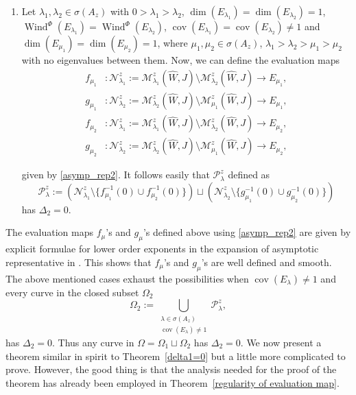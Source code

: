 \documentclass[11pt, a4paper]{amsart}
\newcommand{\cM}{\mathcal{M}}
\newcommand{\cN}{\mathcal{N}}
\newcommand{\cP}{\mathcal{P}}
\DeclareMathOperator{\wind}{Wind}
\DeclareMathOperator{\cov}{cov}
\begin{document}
\begin{enumerate}[topsep=5pt,itemsep=5pt]
    \item Let $\lambda_1, \lambda_2 \in \sigma(A_z)$ with $0>\lambda_1>\lambda_2$, $\dim(E_{\lambda_1})=\dim(E_{\lambda_2})=1$, $\wind^{\Phi}(E_{\lambda_1})=\wind^{\Phi}(E_{\lambda_2})$, $\cov(E_{\lambda_1})=\cov(E_{\lambda_2}) \neq 1$ and $\dim(E_{\mu_1})=\dim(E_{\mu_2})=1$, where $\mu_1,\mu_2 \in \sigma(A_z)$, $\lambda_1> \lambda_2>\mu_1>\mu_2$ with no eigenvalues between them.  Now, we can define the evaluation maps 
    \begin{equation*}
        \begin{split}
            f_{\mu_1} &:\cN^z_{\lambda_1}:=\cM^z_{\lambda_1}(\widehat{W},J) \setminus \cM^z_{\lambda_2}(\widehat{W},J) \rightarrow E_{\mu_1},\\ 
            g_{\mu_1} &:\cN^z_{\lambda_2}:=\cM^z_{\lambda_2}(\widehat{W},J) \setminus \cM^z_{\mu_1}(\widehat{W},J) \rightarrow E_{\mu_1},\\
            f_{\mu_2} &:\cN^z_{\lambda_1}:=\cM^z_{\lambda_1}(\widehat{W},J) \setminus \cM^z_{\lambda_2}(\widehat{W},J) \rightarrow E_{\mu_2},\\
            g_{\mu_2} &:\cN^z_{\lambda_2}:=\cM^z_{\lambda_2}(\widehat{W},J) \setminus \cM^z_{\mu_1}(\widehat{W},J) \rightarrow E_{\mu_2},
        \end{split}
    \end{equation*}

     given by \cref{asymp_rep2}.  It follows easily that $\cP^z_{\lambda}$ defined as $$\cP^z_{\lambda}:=\left(\cN^z_{\lambda_1} \setminus \{f_{\mu_1}^{-1}(0)\cup f_{\mu_2}^{-1}(0)\}\right) \sqcup \left(\cN^z_{\lambda_2} \setminus \{g_{\mu_1}^{-1}(0)\cup g_{\mu_2}^{-1}(0)\}\right)$$ has $\Delta_2=0$.
\end{enumerate}

The evaluation maps $f_{\mu}$'s and $g_{\mu}$'s defined above using \cref{asymp_rep2} are given by explicit formulae for lower order exponents in the expansion of asymptotic representative in \cite[Lemma~3.1]{Siefinter2008}. This shows that $f_{\mu}$'s and $g_{\mu}$'s are well defined and smooth. The above mentioned cases exhaust the possibilities when $\cov(E_{\lambda})\neq 1$ and every curve in the closed subset $\Omega_2$
$$\Omega_2:=\bigcup_{\substack{\lambda \in \sigma(A_z)\\ \cov(E_{\lambda})\neq1}} \cP^z_{\lambda},$$
has $\Delta_2=0$. Thus any curve in $\Omega= \Omega_1 \sqcup \Omega_2$ has $\Delta_2=0$. 
We now present a theorem similar in spirit to Theorem~\ref{delta1=0} but a little more complicated to prove. However, the good thing is that the analysis needed for the proof of the theorem  has already been employed in Theorem~\ref{regularity of evaluation map}.
\end{document}
